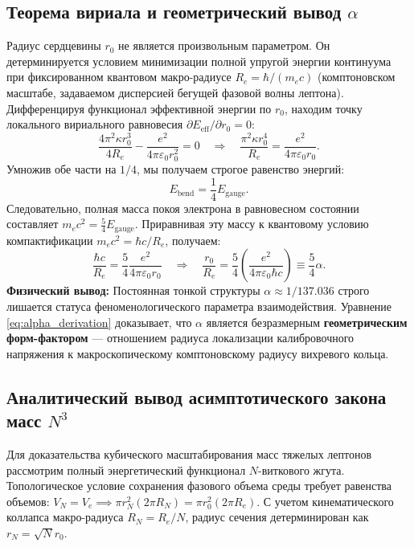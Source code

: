 \documentclass[12pt,a4paper]{article}
\begin{document}
\subsection{Теорема вириала и геометрический вывод $\alpha$}
Радиус сердцевины $r_0$ не является произвольным параметром. Он детерминируется условием минимизации полной упругой энергии континуума при фиксированном квантовом макро-радиусе $R_e = \hbar / (m_e c)$ (комптоновском масштабе, задаваемом дисперсией бегущей фазовой волны лептона).
Дифференцируя функционал эффективной энергии по $r_0$, находим точку локального вириального равновесия $\partial E_{\text{eff}} / \partial r_0 = 0$:
\begin{equation}
\frac{4 \pi^2 \kappa r_0^3}{4R_e} - \frac{e^2}{4\pi\varepsilon_0 r_0^2} = 0 \quad \Longrightarrow \quad \frac{\pi^2 \kappa r_0^4}{R_e} = \frac{e^2}{4\pi\varepsilon_0 r_0}.
\end{equation}
Умножив обе части на $1/4$, мы получаем строгое равенство энергий:
\begin{equation}
E_{\text{bend}} = \frac{1}{4} E_{\text{gauge}}.
\end{equation}
Следовательно, полная масса покоя электрона в равновесном состоянии составляет $m_e c^2 = \frac{5}{4} E_{\text{gauge}}$. Приравнивая эту массу к квантовому условию компактификации $m_e c^2 = \hbar c / R_e$, получаем:
\begin{equation}
\frac{\hbar c}{R_e} = \frac{5}{4} \frac{e^2}{4\pi\varepsilon_0 r_0} \quad \Longrightarrow \quad \frac{r_0}{R_e} = \frac{5}{4} \left( \frac{e^2}{4\pi\varepsilon_0 \hbar c} \right) \equiv \frac{5}{4} \alpha.
\label{eq:alpha_derivation}
\end{equation}
\textbf{Физический вывод:} Постоянная тонкой структуры $\alpha \approx 1/137.036$ строго лишается статуса феноменологического параметра взаимодействия. Уравнение \eqref{eq:alpha_derivation} доказывает, что $\alpha$ является безразмерным \textbf{геометрическим форм-фактором} — отношением радиуса локализации калибровочного напряжения к макроскопическому комптоновскому радиусу вихревого кольца.

\subsection{Аналитический вывод асимптотического закона масс $N^3$}
Для доказательства кубического масштабирования масс тяжелых лептонов рассмотрим полный энергетический функционал $N$-виткового жгута. Топологическое условие сохранения фазового объема среды требует равенства объемов: $V_N = V_e \implies \pi r_N^2 (2\pi R_N) = \pi r_0^2 (2\pi R_e)$. С учетом кинематического коллапса макро-радиуса $R_N = R_e / N$, радиус сечения детерминирован как $r_N = \sqrt{N} r_0$.
\end{document}
